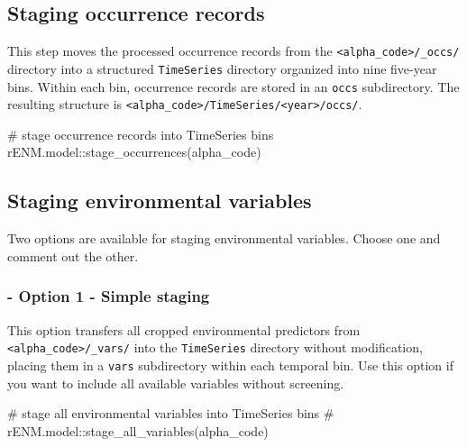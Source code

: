 \documentclass[
  letterpaper,
  DIV=11,
  numbers=noendperiod]{scrartcl}
\newenvironment{Shaded}{\begin{snugshade}}{\end{snugshade}}
\newcommand{\CommentTok}[1]{\textcolor[rgb]{0.37,0.37,0.37}{#1}}
\newcommand{\FunctionTok}[1]{\textcolor[rgb]{0.28,0.35,0.67}{#1}}
\newcommand{\NormalTok}[1]{\textcolor[rgb]{0.00,0.23,0.31}{#1}}
\newcommand{\SpecialCharTok}[1]{\textcolor[rgb]{0.37,0.37,0.37}{#1}}
\begin{document}
\subsection{Staging occurrence
records}\label{staging-occurrence-records}

This step moves the processed occurrence records from the
\texttt{\textless{}alpha\_code\textgreater{}/\_occs/} directory into a
structured \texttt{TimeSeries} directory organized into nine five-year
bins. Within each bin, occurrence records are stored in an \texttt{occs}
subdirectory. The resulting structure is
\texttt{\textless{}alpha\_code\textgreater{}/TimeSeries/\textless{}year\textgreater{}/occs/}.

\begin{Shaded}
\begin{Highlighting}[]
\CommentTok{\# stage occurrence records into TimeSeries bins}
\NormalTok{rENM.model}\SpecialCharTok{::}\FunctionTok{stage\_occurrences}\NormalTok{(alpha\_code)}
\end{Highlighting}
\end{Shaded}

\subsection{Staging environmental
variables}\label{staging-environmental-variables}

Two options are available for staging environmental variables. Choose
one and comment out the other.

\subsubsection{- Option 1 - Simple
staging}\label{option-1---simple-staging}

This option transfers all cropped environmental predictors from
\texttt{\textless{}alpha\_code\textgreater{}/\_vars/} into the
\texttt{TimeSeries} directory without modification, placing them in a
\texttt{vars} subdirectory within each temporal bin. Use this option if
you want to include all available variables without screening.

\begin{Shaded}
\begin{Highlighting}[]
\CommentTok{\# stage all environmental variables into TimeSeries bins}
\CommentTok{\# rENM.model::stage\_all\_variables(alpha\_code)}
\end{Highlighting}
\end{Shaded}
\end{document}
